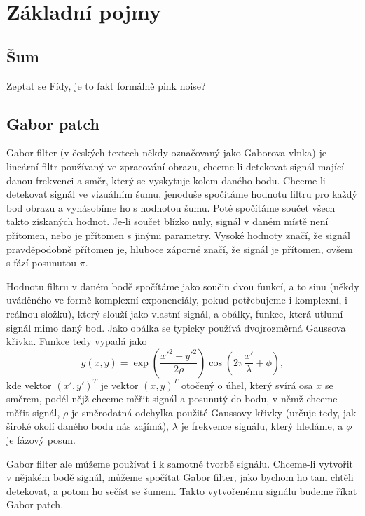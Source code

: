 \chapter{Základní pojmy}

\section{Šum}

Zeptat se Fíďy, je to fakt formálně pink noise?




\section{Gabor patch}

Gabor filter (v českých textech někdy označovaný jako Gaborova vlnka) je
lineární filtr používaný ve zpracování obrazu, chceme-li detekovat signál
mající danou frekvenci a směr, který se vyskytuje kolem daného bodu.
Chceme-li detekovat signál ve vizuálním šumu, jenoduše spočítáme hodnotu filtru
pro každý bod obrazu a vynásobíme ho s hodnotou šumu. Poté spočítáme součet
všech takto získaných hodnot. Je-li součet blízko nuly, signál v daném místě
není přítomen, nebo je přítomen s jinými parametry. Vysoké hodnoty značí, že
signál pravděpodobně přítomen je, hluboce záporné značí, že signál je přítomen,
ovšem s fází posunutou $\pi$.

Hodnotu filtru v daném bodě spočítáme jako součin dvou funkcí, a to sinu (někdy
uváděného ve formě komplexní exponenciály, pokud potřebujeme i komplexní, i
reálnou složku), který slouží jako vlastní signál, a obálky, funkce, která
utlumí signál mimo daný bod. Jako obálka se typicky používá dvojrozměrná
Gaussova křivka. Funkce tedy vypadá jako $$g(x,y) = \exp\left(\frac{x'^2 +
y'^2}{2\rho}\right)\cos\left(2\pi\frac{x'}{\lambda}+\phi\right),$$ kde vektor
$(x',y')^T$ je vektor $(x,y)^T$ otočený o úhel, který svírá osa $x$ se směrem,
podél nějž chceme měřit signál a posunutý do bodu, v němž chceme měřit signál,
$\rho$ je směrodatná odchylka použité Gaussovy křivky (určuje tedy, jak široké
okolí daného bodu nás zajímá), $\lambda$ je frekvence signálu, který hledáme, a
$\phi$ je fázový posun.
   
Gabor filter ale můžeme používat i k samotné tvorbě signálu. Chceme-li vytvořit
v nějakém bodě signál, můžeme spočítat Gabor filter, jako bychom ho tam chtěli
detekovat, a potom ho sečíst se šumem. Takto vytvořenému signálu budeme říkat
Gabor patch.

